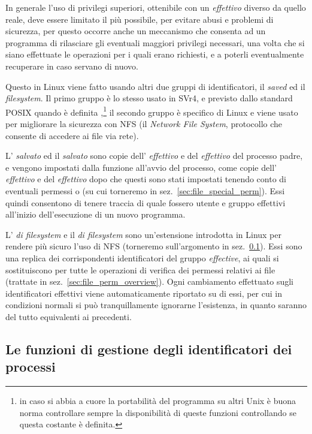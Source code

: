 In generale l'uso di privilegi superiori, ottenibile con un 
\textsl{effettivo} diverso da quello reale, deve essere limitato il più
possibile, per evitare abusi e problemi di sicurezza, per questo occorre anche
un meccanismo che consenta ad un programma di rilasciare gli eventuali
maggiori privilegi necessari, una volta che si siano effettuate le operazioni
per i quali erano richiesti, e a poterli eventualmente recuperare in caso
servano di nuovo.

Questo in Linux viene fatto usando altri due gruppi di identificatori, il
\textit{saved} ed il \textit{filesystem}. Il primo gruppo è lo stesso usato in
SVr4, e previsto dallo standard POSIX quando è definita
,\footnote{in caso si abbia a cuore la portabilità
  del programma su altri Unix è buona norma controllare sempre la
  disponibilità di queste funzioni controllando se questa costante è
  definita.} il secondo gruppo è specifico di Linux e viene usato per
migliorare la sicurezza con NFS (il \textit{Network File System}, protocollo
che consente di accedere ai file via rete).

L' \textsl{salvato} ed il  \textsl{salvato} sono copie
dell' \textsl{effettivo} e del  \textsl{effettivo} del
processo padre, e vengono impostati dalla funzione  all'avvio del
processo, come copie dell' \textsl{effettivo} e del 
\textsl{effettivo} dopo che questi sono stati impostati tenendo conto di
eventuali permessi  o  (su cui torneremo in
sez.~\ref{sec:file_special_perm}).  Essi quindi consentono di tenere traccia
di quale fossero utente e gruppo effettivi all'inizio dell'esecuzione di un
nuovo programma.

L' \textsl{di filesystem} e il  \textsl{di filesystem} sono
un'estensione introdotta in Linux per rendere più sicuro l'uso di NFS
(torneremo sull'argomento in sez.~\ref{sec:proc_setuid}). Essi sono una
replica dei corrispondenti identificatori del gruppo \textit{effective}, ai
quali si sostituiscono per tutte le operazioni di verifica dei permessi
relativi ai file (trattate in sez.~\ref{sec:file_perm_overview}).  Ogni
cambiamento effettuato sugli identificatori effettivi viene automaticamente
riportato su di essi, per cui in condizioni normali si può tranquillamente
ignorarne l'esistenza, in quanto saranno del tutto equivalenti ai precedenti.


\subsection{Le funzioni di gestione degli identificatori dei processi}
\label{sec:proc_setuid}

